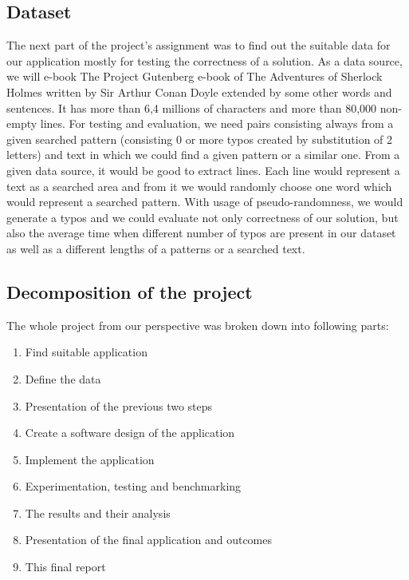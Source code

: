 \documentclass[12pt,a4paper,titlepage,final]{article}
\begin{document}
	\subsection{Dataset} \label{dataset}
	The next part of the project's assignment was to find out the suitable data for our application mostly for testing the correctness of a solution. As a data source, we will e-book The Project Gutenberg e-book of The Adventures of Sherlock
Holmes written by Sir Arthur Conan Doyle extended by some other words and sentences. It has more than 6,4 millions of characters and more than 80,000 non-empty lines. For testing and evaluation, we need pairs consisting always from a given searched pattern (consisting 0 or more typos created by substitution of 2 letters) and text in which we could find a given pattern or a similar one. From a given data source, it would be good to extract lines. Each line would represent a text as a  searched area and from it we would randomly choose one word which would represent a searched pattern. With usage of pseudo-randomness, we would generate a typos and we could evaluate not only correctness of our solution, but also the average time when different number of typos are present in our dataset as well as a different lengths of a patterns or a searched text.

	\subsection{Decomposition of the project}
	The whole project from our perspective was broken down into following parts:
	\begin{enumerate}
		\item Find suitable application
		\item Define the data
   		 \item Presentation of the previous two steps
		\item Create a software design of the application
		\item Implement the application 
    	\item Experimentation, testing and benchmarking
    	\item The results and their analysis
    	\item Presentation of the final application and outcomes
    	\item This final report
	\end{enumerate}


\end{document}
